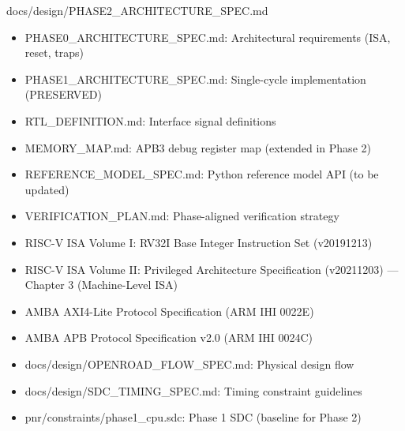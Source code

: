 \begin{relocated}{docs/design/PHASE2_ARCHITECTURE_SPEC.md}
\begin{itemize}
\tightlist
\item
  PHASE0\_\allowbreak{}ARCHITECTURE\_\allowbreak{}SPEC.md: Architectural
  requirements (ISA, reset, traps)
\item
  PHASE1\_\allowbreak{}ARCHITECTURE\_\allowbreak{}SPEC.md: Single-cycle
  implementation (PRESERVED)
\item
  RTL\_\allowbreak{}DEFINITION.md: Interface signal definitions
\item
  MEMORY\_\allowbreak{}MAP.md: APB3 debug register map (extended in
  Phase 2)
\item
  REFERENCE\_\allowbreak{}MODEL\_\allowbreak{}SPEC.md: Python reference
  model API (to be updated)
\item
  VERIFICATION\_\allowbreak{}PLAN.md: Phase-aligned verification
  strategy
\item
  RISC-V ISA Volume I: RV32I Base Integer Instruction Set (v20191213)
\item
  RISC-V ISA Volume II: Privileged Architecture Specification
  (v20211203) --- Chapter 3 (Machine-Level ISA)
\item
  AMBA AXI4-Lite Protocol Specification (ARM IHI 0022E)
\item
  AMBA APB Protocol Specification v2.0 (ARM IHI 0024C)
\item
  docs/\allowbreak{}design/\allowbreak{}OPENROAD\_\allowbreak{}FLOW\_\allowbreak{}SPEC.md:
  Physical design flow
\item
  docs/\allowbreak{}design/\allowbreak{}SDC\_\allowbreak{}TIMING\_\allowbreak{}SPEC.md:
  Timing constraint guidelines
\item
  pnr/\allowbreak{}constraints/\allowbreak{}phase1\_\allowbreak{}cpu.sdc:
  Phase 1 SDC (baseline for Phase 2)
\end{itemize}
\end{relocated}

